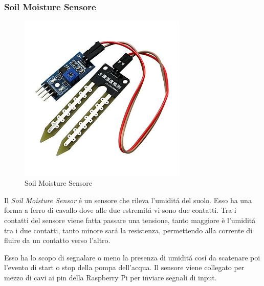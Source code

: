 \subsubsection{Soil Moisture Sensore}
\begin{figure}
    \centering
    \includegraphics[width=8cm]{Immagini/soil_moisture_sensore}
    \caption{Soil Moisture Sensore}
    \label{fig:soil_moisture_sensore}
\end{figure}
Il {\em Soil Moisture Sensor} \'e un sensore che rileva l'umidit\'a del suolo. Esso ha una forma a ferro di cavallo dove alle due estremit\'a vi sono due contatti. Tra i contatti del sensore viene fatta passare una tensione, tanto maggiore è l'umidit\'a tra i due contatti, tanto minore sar\'a la resistenza, permettendo alla corrente di fluire da un contatto verso l'altro. 

Esso ha lo scopo di segnalare o meno la presenza di umidit\'a cos\'i da scatenare poi l'evento di start o stop della pompa dell'acqua. Il sensore viene collegato per mezzo di cavi ai pin della Raspberry Pi per inviare segnali di input.

